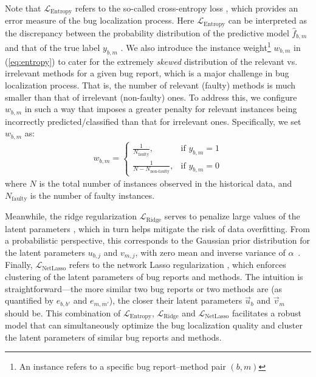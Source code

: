 Note that $\mathcal{L}_\text{Entropy}$ refers to the so-called cross-entropy loss \cite{Murphy:2012:MLP:2380985}, which provides an error measure of the bug localization process. Here $\mathcal{L}_\text{Entropy}$ can be interpreted as the discrepancy between the probability distribution of the predictive model $\hat{f}_{b,m}$ and that of the true label $y_{b,m}$ \cite{Murphy:2012:MLP:2380985}. We also introduce the instance weight\footnote{An instance refers to a specific bug report--method pair $(b,m)$} $w_{b,m}$ in (\ref{eq:entropy}) to cater for the extremely \emph{skewed} distribution of the relevant vs. irrelevant methods for a given bug report, which is a major challenge in bug localization process. That is, the number of relevant (faulty) methods is much smaller than that of irrelevant (non-faulty) ones. To address this, we configure $w_{b,m}$ in such a way that imposes a greater penalty for relevant instances being incorrectly predicted/classified than that for irrelevant ones. Specifically, we set $w_{b,m}$ as:
\begin{align}
w_{b,m} =
\begin{cases}
    \frac{1}{N_\text{faulty}},     & \text{if } y_{b,m} = 1\\
    \frac{1}{N - N_\text{non-faulty}}, & \text{if } y_{b,m} = 0
\end{cases}
\end{align}
where $N$ is the total number of instances observed in the historical data, and $N_\text{faulty}$ is the number of faulty instances.

Meanwhile, the ridge regularization $\mathcal{L}_\text{Ridge}$ serves to penalize large values of the latent parameters \cite{Murphy:2012:MLP:2380985}, which in turn helps mitigate the risk of data overfitting. From a probabilistic perspective, this corresponds to the Gaussian prior distribution for the latent parameters $u_{b,j}$ and $v_{m,j}$, with zero mean and inverse variance of $\alpha$~\cite{Le:2015:IRS:2786805.2786880}. Finally, $\mathcal{L}_\text{NetLasso}$ refers to the network Lasso regularization \cite{Hallac:2015:NLC:2783258.2783313}, which enforces clustering of the latent parameters of bug reports and methods. The intuition is straightforward---the more similar two bug reports or two methods are (as quantified by $e_{b,b'}$ and $e_{m,m'}$), the closer their latent parameters $\vec{u}_b$ and $\vec{v}_m$ should be. This combination of $\mathcal{L}_\text{Entropy}$, $\mathcal{L}_\text{Ridge}$ and $\mathcal{L}_\text{NetLasso}$ facilitates a robust model that can simultaneously optimize the bug localization quality and cluster the latent parameters of similar bug reports and methods.

